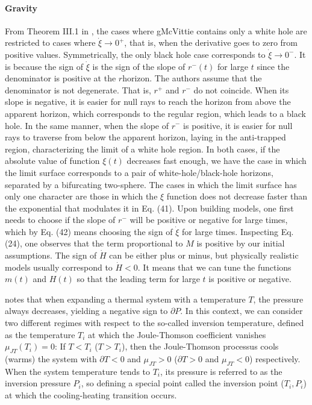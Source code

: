 \documentclass[11pt]{book}
\begin{document}
\paragraph{Gravity}

From Theorem III.1 in \cite{maciel2015cosmological}, the cases where
gMcVittie contains only a white hole are restricted to cases where
$\dot{\xi}\rightarrow0^{+}$, that is, when the derivative goes to
zero from positive values. Symmetrically, the only black hole case
corresponds to $\dot{\xi}\rightarrow0^{-}$. It is because the sign
of $\dot{\xi}$ is the sign of the slope of $r^{-}\left(t\right)$
for large $t$ since the denominator is positive at the $r$\textminus horizon.
The authors assume that the denominator is not degenerate. That is,
$r^{+}$ and $r^{-}$ do not coincide. When its slope is negative,
it is easier for null rays to reach the horizon from above the apparent
horizon, which corresponds to the regular region, which leads to a
black hole. In the same manner, when the slope of $r^{-}$ is positive,
it is easier for null rays to traverse from below the apparent horizon,
laying in the anti-trapped region, characterizing the limit of a white
hole region. In both cases, if the absolute value of function $\xi\left(t\right)$
decreases fast enough, we have the case in which the limit surface
corresponds to a pair of white-hole/black-hole horizons, separated
by a bifurcating two-sphere. The cases in which the limit surface
has only one character are those in which the $\xi$ function does
not decrease faster than the exponential that modulates it in Eq.
(41). Upon building models, one first needs to choose if the slope
of $r^{-}$ will be positive or negative for large times, which by
Eq. (42) means choosing the sign of $\dot{\xi}$ for large times.
Inspecting Eq. (24), one observes that the term proportional to $M$
is positive by our initial assumptions. The sign of $\dot{H}$ can
be either plus or minus, but physically realistic models usually correspond
to $\dot{H}<0$. It means that we can tune the functions $m\left(t\right)$
and $H\left(t\right)$ so that the leading term for large $t$ is
positive or negative.

\cite{chabab2018joule} notes that when expanding a thermal system
with a temperature $T$, the pressure always decreases, yielding a
negative sign to $\partial P$. In this context, we can consider two
different regimes with respect to the so-called inversion temperature,
defined as the temperature $T_{i}$ at which the Joule-Thomson coefficient
vanishes $\mu_{JT}(T_{i})=0$: If $T<T_{i}$ ($T>T_{i}$), then the
Joule-Thomson processus cools (warms) the system with $\partial T<0$
and $\mu_{JT}>0$ ($\partial T>0$ and $\mu_{JT}<0$) respectively.
When the system temperature tends to $T_{i}$, its pressure is referred
to as the inversion pressure $P_{i}$, so defining a special point
called the inversion point ($T_{i},P_{i}$) at which the cooling-heating
transition occurs.
\end{document}
